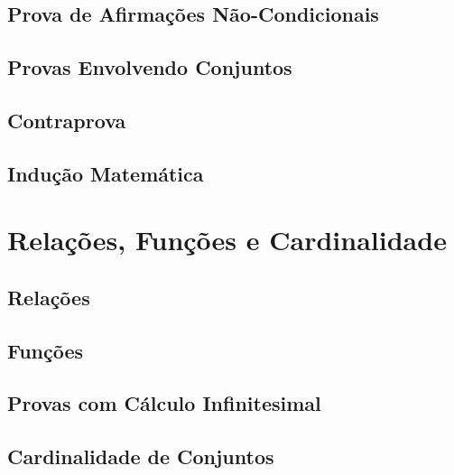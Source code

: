 \documentclass[a4paper,11pt]{book}
\theoremstyle{definition}
\theoremstyle{break}
\begin{document}
\chapter{Prova de Afirmações Não-Condicionais}

\chapter{Provas Envolvendo Conjuntos}

\chapter{Contraprova}

\chapter{Indução Matemática}


\part{Relações, Funções e Cardinalidade}

\chapter{Relações}

\chapter{Funções}

\chapter{Provas com Cálculo Infinitesimal}

\chapter{Cardinalidade de Conjuntos}
\end{document}
